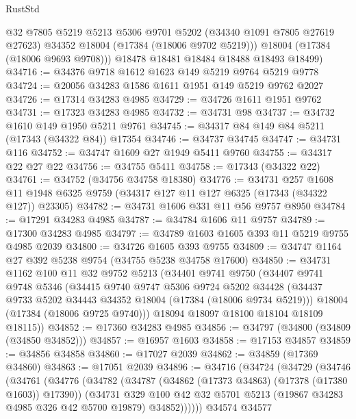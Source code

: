 \begin{lexlean}{RustStd}
\begin{coremodule}
          @32
          @7805
          @5219
          @5213
          @5306
          @9701
          @5202
          (@34340 @1091 @7805 @27619 @27623)
          @34352
          @18004
          (@17384 (@18006 @9702 @5219)))
        @18004
        (@17384 (@18006 @9693 @9708)))
      @18478
      @18481
      @18484
      @18488
      @18493
      @18499)
@34716 := @34376 @9718 @1612 @1623 @149 @5219 @9764 @5219 @9778
@34724 := @20056 @34283 @1586 @1611 @1951 @149 @5219 @9762 @2027
@34726 := @17314 @34283 @4985
@34729 := @34726 @1611 @1951 @9762
@34731 := @17323 @34283 @4985
@34732 := @34731 @98
@34737 := @34732 @1610 @149 @1950 @5211 @9761
@34745 := @34317 @84 @149 @84 @5211 (@17343 (@34322 @84)) @17354
@34746 := @34737 @34745
@34747 := @34731 @116
@34752 := @34747 @1609 @27 @1949 @5411 @9760
@34755 := @34317 @22 @27 @22
@34756 := @34755 @5411
@34758 := @17343 (@34322 @22)
@34761 := @34752 (@34756 @34758 @18380)
@34776 := @34731
    @257
    @1608
    @11
    @1948
    @6325
    @9759
    (@34317 @127 @11 @127 @6325 (@17343 (@34322 @127)) @23305)
@34782 := @34731 @1606 @331 @11 @56 @9757 @8950
@34784 := @17291 @34283 @4985
@34787 := @34784 @1606 @11 @9757
@34789 := @17300 @34283 @4985
@34797 := @34789 @1603 @1605 @393 @11 @5219 @9755 @4985 @2039
@34800 := @34726 @1605 @393 @9755
@34809 := @34747 @1164 @27 @392 @5238 @9754 (@34755 @5238 @34758 @17600)
@34850 := @34731
    @1162
    @100
    @11
    @32
    @9752
    @5213
    (@34401
      @9741
      @9750
      (@34407
        @9741
        @9748
        @5346
        (@34415
          @9740
          @9747
          @5306
          @9724
          @5202
          @34428
          (@34437 @9733 @5202 @34443 @34352 @18004 (@17384 (@18006 @9734 @5219)))
          @18004
          (@17384 (@18006 @9725 @9740)))
        @18094
        @18097
        @18100
        @18104
        @18109
        @18115))
@34852 := @17360 @34283 @4985
@34856 := @34797 (@34800 (@34809 (@34850 @34852)))
@34857 := @16957 @1603
@34858 := @17153 @34857
@34859 := @34856 @34858
@34860 := @17027 @2039
@34862 := @34859 (@17369 @34860)
@34863 := @17051 @2039
@34896 := @34716
    (@34724
      (@34729
        (@34746
          (@34761
            (@34776
              (@34782
                (@34787 (@34862 (@17373 @34863) (@17378 (@17380 @1603)) @17390))
                (@34731
                  @329
                  @100
                  @42
                  @32
                  @5701
                  @5213
                  (@19867 @34283 @4985 @326 @42 @5700 @19879)
                  @34852))))))
      @34574
      @34577

\end{coremodule}
\end{lexlean}
